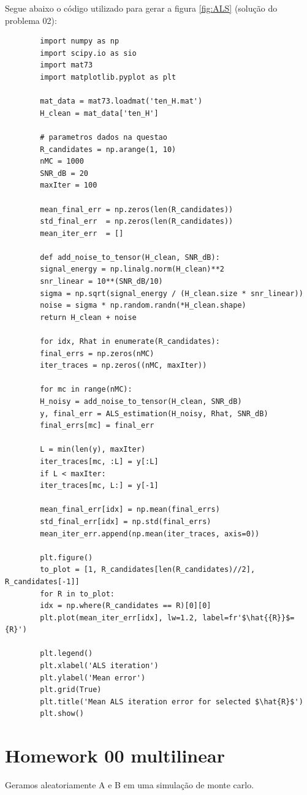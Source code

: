 	Segue abaixo o código utilizado para gerar a figura \ref{fig:ALS} (solução do problema 02):
	\begin{lstlisting}
		import numpy as np
		import scipy.io as sio
		import mat73
		import matplotlib.pyplot as plt
		
		mat_data = mat73.loadmat('ten_H.mat')
		H_clean = mat_data['ten_H']
		
		# parametros dados na questao
		R_candidates = np.arange(1, 10)
		nMC = 1000
		SNR_dB = 20
		maxIter = 100
		
		mean_final_err = np.zeros(len(R_candidates))
		std_final_err  = np.zeros(len(R_candidates))
		mean_iter_err  = []
		
		def add_noise_to_tensor(H_clean, SNR_dB):
		signal_energy = np.linalg.norm(H_clean)**2
		snr_linear = 10**(SNR_dB/10)
		sigma = np.sqrt(signal_energy / (H_clean.size * snr_linear))
		noise = sigma * np.random.randn(*H_clean.shape)
		return H_clean + noise
		
		for idx, Rhat in enumerate(R_candidates):
		final_errs = np.zeros(nMC)
		iter_traces = np.zeros((nMC, maxIter))
		
		for mc in range(nMC):
		H_noisy = add_noise_to_tensor(H_clean, SNR_dB)
		y, final_err = ALS_estimation(H_noisy, Rhat, SNR_dB)
		final_errs[mc] = final_err
		
		L = min(len(y), maxIter)
		iter_traces[mc, :L] = y[:L]
		if L < maxIter:
		iter_traces[mc, L:] = y[-1]
		
		mean_final_err[idx] = np.mean(final_errs)
		std_final_err[idx] = np.std(final_errs)
		mean_iter_err.append(np.mean(iter_traces, axis=0))
		
		plt.figure()
		to_plot = [1, R_candidates[len(R_candidates)//2], R_candidates[-1]]
		for R in to_plot:
		idx = np.where(R_candidates == R)[0][0]
		plt.plot(mean_iter_err[idx], lw=1.2, label=fr'$\hat{{R}}$={R}')
		
		plt.legend()
		plt.xlabel('ALS iteration')
		plt.ylabel('Mean error')
		plt.grid(True)
		plt.title('Mean ALS iteration error for selected $\hat{R}$')
		plt.show()
	\end{lstlisting}
	
	\section{Homework 00 multilinear}
	
	Geramos aleatoriamente A e B em uma simulação de monte carlo.
	
	
	
